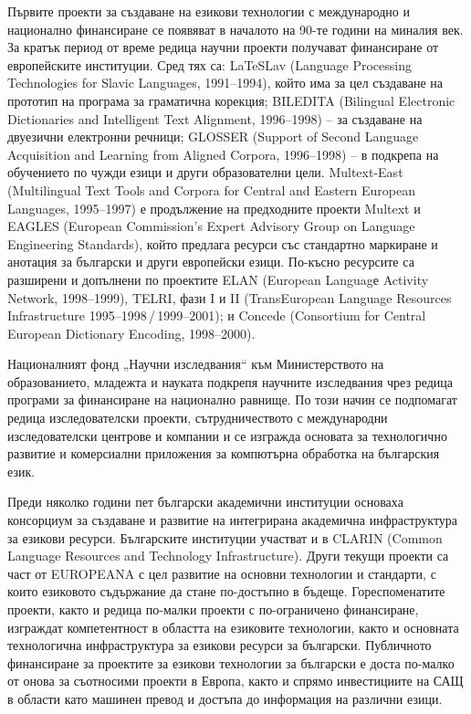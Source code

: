 \begin{multicols}{2}
  Първите проекти за създаване на езикови
   технологии с международно и национално финансиране
   се появяват в началото на 90-те години на миналия
   век. За кратък период от време редица научни проекти
   получават финансиране от европейските институции.
   Сред тях са: LaTeSLav (Language Processing Technologies for Slavic Languages, 1991--1994), който има за цел
   създаване на прототип на програма за граматична
   корекция; BILEDITA (Bilingual Electronic Dictionaries and Intelligent Text Alignment, 1996--1998) – за създаване на
   двуезични електронни речници; GLOSSER (Support of Second Language Acquisition and Learning from Aligned Corpora, 1996--1998)
   – в подкрепа на обучението по чужди езици и други
   образователни цели. Multext-East (Multilingual Text Tools and Corpora for Central and Eastern European Languages, 1995--1997) е
   продължение на предходните проекти Multext и EAGLES (European Commission's Expert Advisory Group on Language Engineering Standards), който предлага ресурси със стандартно маркиране
   и анотация за български
  и други европейски езици. По-късно ресурсите са разширени и допълнени по проектите ELAN (European Languagе Activity Network, 1998--1999), TELRI, фази I и II (TransEuropean Language Resources Infrastructure 1995--1998\,/\,1999--2001); и Concede (Consortium for Central European
   Dictionary Encoding, 1998--2000).

  Националният фонд „Научни изследвания“ към Министерството на образованието, младежта и науката
   подкрепя научните изследвания чрез редица програми
   за финансиране на национално равнище. По този начин се подпомагат редица изследователски проекти, сътрудничеството с международни изследователски
   центрове и компании и се изгражда основата
   за технологично развитие и комерсиални приложения за
  компютърна обработка на българския език.

  Преди няколко години пет български академични институции основаха консорциум за създаване и развитие на интегрирана академична инфраструктура за
   езикови ресурси. Българските институции участват и в
   CLARIN  (Common Language Resources and Technology Infrastructure). Други текущи проекти са част от EUROPEANA с
   цел развитие на основни технологии и стандарти, с които
  езиковото съдържание да стане по-достъпно в бъдеще.
   Гореспоменатите проекти, както и редица по-малки
   проекти с по-ограничено финансиране, изграждат
   компетентност в областта на езиковите технологии,
   както и основната технологична инфраструктура за
   езикови ресурси за български. Публичното финансиране
   за проектите за езикови технологии за български е доста
   по-малко от онова за съотносими проекти в Европа, както
   и спрямо инвестициите на САЩ \cite{sprachtech} в области като машинен превод и достъпа до информация на различни езици.


\end{multicols}
